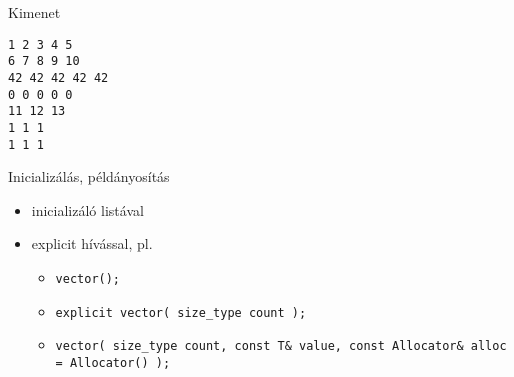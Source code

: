 \begin{frame}
    \begin{exampleblock}{}
        \scriptsize
        
        
    \end{exampleblock}
\end{frame}

\begin{frame}
    \begin{exampleblock}{}
        \small
        
    \end{exampleblock}
\end{frame}

\begin{frame}
    \begin{exampleblock}{}
        \footnotesize
        \vspace{-.2cm}
        
        \vspace{-.2cm}
    \end{exampleblock}
\end{frame}

\begin{frame}[fragile]
    \begin{block}{Kimenet}
        \vspace{-.4cm}
        \begin{verbatim}
1 2 3 4 5 
6 7 8 9 10 
42 42 42 42 42 
0 0 0 0 0 
11 12 13 
1 1 1 
1 1 1
\end{verbatim}
        \vspace{-.3cm}
    \end{block}
\end{frame}

\begin{frame}
    Inicializálás, példányosítás
    \begin{itemize}
        \item inicializáló listával
        \item explicit  hívással, pl.
        \begin{itemize}
            \item \texttt{vector();}
            \item \texttt{explicit vector( size\_type count );}
            \item \texttt{vector( size\_type count, const T\& value, const Allocator\& alloc = Allocator() );}
        \end{itemize}
    \end{itemize}
\end{frame}

